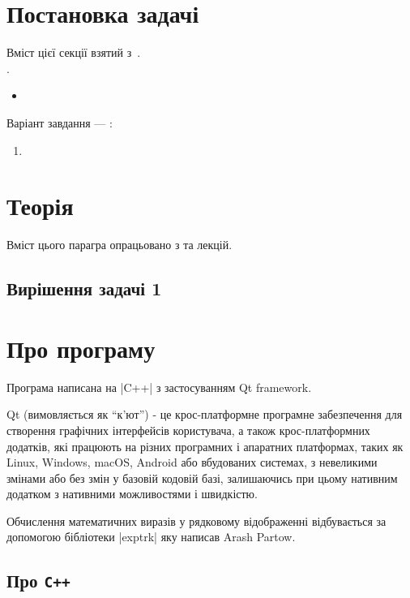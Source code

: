\documentclass[../../../../document]{subfiles}
\begin{document}
	\chapter{Постановка задачі}
	Вміст цієї секції взятий з~\cite{computational_methods}.\\
	 \worktheme.\\
	\begin{itemize}
		\item
	\end{itemize}
	Варіант завдання --- \studentnumber:
	\begin{enumerate}
		\item
	\end{enumerate}

	\chapter{Теорія}
	Вміст цього парагра опрацьовано з \cite{computational_methods} та лекцій.
	\section{Вирішення задачі 1}

	\FloatBarrier
	\chapter{Про програму}
	Програма написана на \textinline|C++| з застосуванням Qt framework.

	Qt (вимовляється як \enquote{к'ют}) - це крос-платформне
	програмне забезпечення для створення графічних інтерфейсів користувача, а також
	крос-платформних додатків, які працюють на різних програмних і апаратних
	платформах, таких як Linux, Windows, macOS, Android або вбудованих системах, з
	невеликими змінами або без змін у базовій кодовій базі, залишаючись при цьому
	нативним додатком з нативними можливостями і швидкістю.
	
	Обчислення математичних виразів у рядковому відображенні відбувається за допомогою бібліотеки \textinline|exptrk| яку написав Arash Partow\cite{exprtk,exprtk-github}.

	\section{Про \texttt{C++}}
\end{document}
